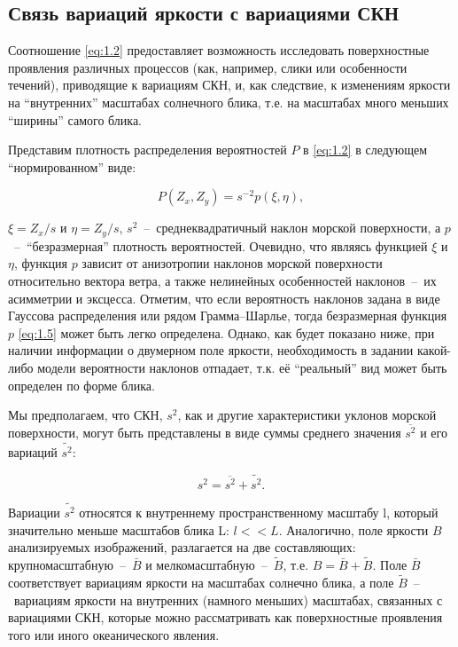 \subsection{Связь вариаций яркости с вариациями СКН}



Соотношение \eqref{eq:1.2} предоставляет возможность исследовать поверхностные проявления различных процессов (как, например, слики или особенности течений), приводящие к вариациям СКН, и, как следствие, к изменениям яркости на ``внутренних'' масштабах солнечного блика, т.е. на масштабах много меньших ``ширины'' самого блика.

Представим плотность распределения вероятностей $P$ в \eqref{eq:1.2} в следующем ``нормированном'' виде:


\begin{equation} \label{eq:1.5} 
    P(Z_{x} ,Z_{y} )=s^{-2} p(\xi ,\eta ), 
\end{equation} 


 $\xi =Z_{x} /s$ и $\eta =Z_{y} /s$, $s^{2} $~--~среднеквадратичный наклон морской поверхности, а $p$~--~``безразмерная'' плотность вероятностей. Очевидно, что являясь функцией $\xi $ и $\eta $, функция $p$ зависит от анизотропии наклонов морской поверхности относительно вектора ветра, а также нелинейных особенностей наклонов~--~их асимметрии и эксцесса. Отметим, что если вероятность наклонов задана в виде Гауссова распределения или рядом Грамма--Шарлье, тогда безразмерная функция $p$ \eqref{eq:1.5} может быть легко определена. Однако, как будет показано ниже, при наличии информации о двумерном поле яркости, необходимость в задании какой-либо модели вероятности наклонов отпадает, т.к. её ``реальный'' вид может быть определен по форме блика. 

Мы предполагаем, что СКН, $s^{2} $, как и другие характеристики уклонов морской поверхности, могут быть представлены в виде суммы среднего значения $\overline{s^{2} }$ и его вариаций $\widetilde{s^{2} }$:


\begin{equation} \label{eq:1.6}
    s^{2} =\overline{s^{2} }+\widetilde{s^{2} }.
\end{equation}


Вариации $\widetilde{s^{2} }$ относятся к внутреннему пространственному масштабу l, который значительно меньше масштабов блика L: $l<<L$. Аналогично, поле яркости $B$ анализируемых изображений, разлагается на две составляющих: крупномасштабную~--~$\bar{B}$ и мелкомасштабную~--~$\tilde{B}$, т.е. $B=\bar{B}+\tilde{B}$. Поле $\bar{B}$ соответствует вариациям яркости на масштабах солнечно блика, а поле $\tilde{B}$~--~вариациям яркости на внутренних (намного меньших) масштабах, связанных с вариациями СКН, которые можно рассматривать как поверхностные проявления того или иного океанического явления.

